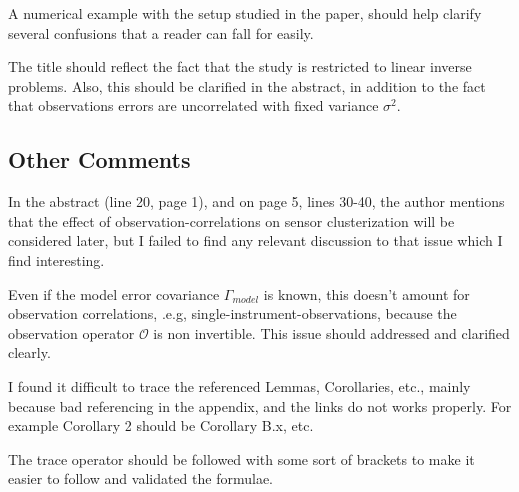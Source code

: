 \documentclass{amsart}
\begin{document}
A numerical example with the setup studied in the paper, should help
clarify several confusions that a reader can fall for easily.

The title should reflect the fact that the study is restricted to
linear inverse problems. Also, this should be clarified in the
abstract, in addition to the fact that observations errors are
uncorrelated with fixed variance $\sigma^2$.



\subsection{Other Comments}

In the abstract (line 20, page 1), and on page 5, lines 30-40, the
author mentions that the effect of observation-correlations on sensor
clusterization will be considered later, but I failed to find any
relevant discussion to that issue which I find interesting.
%

Even if the model error covariance $\Gamma_{model}$ is known, this
doesn't amount for observation correlations, .e.g,
single-instrument-observations, because the observation operator
$\mathcal{O}$ is non invertible. This issue should addressed and
clarified clearly.  


I found it difficult to trace the referenced Lemmas, Corollaries,
etc., mainly because bad referencing in the appendix, and the links do
not works properly.  For example Corollary 2 should be Corollary B.x,
etc.
%

The trace operator should be followed with some sort of brackets to
make it easier to follow and validated the formulae.
\end{document}
